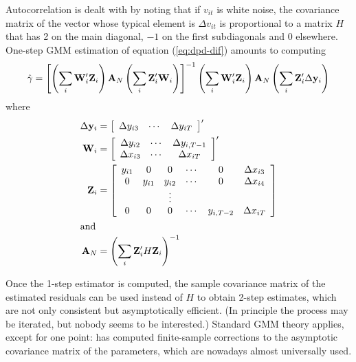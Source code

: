 Autocorrelation is dealt with by noting that if $v_{it}$ is white
noise, the covariance matrix of the vector whose typical element is
$\Delta v_{it}$ is proportional to a matrix $H$ that has 2 on the main
diagonal, $-1$ on the first subdiagonals and 0 elsewhere.  One-step
GMM estimation of equation (\ref{eq:dpd-dif}) amounts to computing
\begin{equation}
\label{eq:dif-gmm}
  \hat{\gamma} = \left[ 
    \left( \sum_i \mathbf{W}_i'\mathbf{Z}_i \right) \mathbf{A}_N
    \left( \sum_i \mathbf{Z}_i'\mathbf{W}_i \right) \right]^{-1} 
    \left( \sum_i \mathbf{W}_i'\mathbf{Z}_i \right) \mathbf{A}_N
    \left( \sum_i \mathbf{Z}_i'\Delta \mathbf{y}_i \right)
\end{equation}
where
\begin{align*}
  \Delta \mathbf{y}_i  & =
     \left[ \begin{array}{ccc}
         \Delta y_{i3} & \cdots & \Delta y_{iT}
       \end{array} \right]' \\
  \mathbf{W}_i  & = 
     \left[ \begin{array}{ccc}
         \Delta y_{i2} & \cdots & \Delta y_{i,T-1} \\
         \Delta x_{i3} & \cdots & \Delta x_{iT} \\
       \end{array} \right]' \\
  \mathbf{Z}_i  & = 
     \left[ \begin{array}{ccccccc}
         y_{i1} & 0 & 0 & \cdots & 0 & \Delta x_{i3}\\
         0 & y_{i1} & y_{i2} & \cdots & 0 & \Delta x_{i4}\\
         & & \vdots \\
         0 & 0 & 0 & \cdots & y_{i,T-2} & \Delta x_{iT} \\
       \end{array} \right] \\
  \intertext{and}
  \mathbf{A}_N & = \left( \sum_i \mathbf{Z}_i' H \mathbf{Z}_i \right)^{-1}
\end{align*}

Once the 1-step estimator is computed, the sample covariance matrix of
the estimated residuals can be used instead of $H$ to obtain 2-step
estimates, which are not only consistent but asymptotically
efficient. (In principle the process may be iterated, but nobody seems
to be interested.) Standard GMM theory applies, except for one point:
\cite{Windmeijer05} has computed finite-sample corrections to the
asymptotic covariance matrix of the parameters, which are nowadays
almost universally used.

